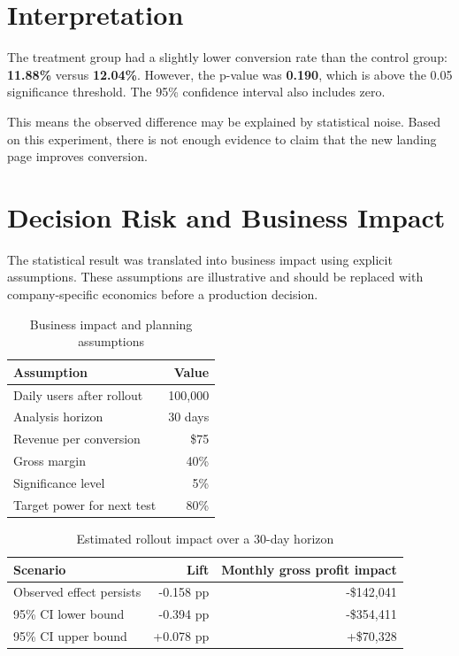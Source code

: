 \documentclass[11pt,a4paper]{article}
\begin{document}
\section{Interpretation}

The treatment group had a slightly lower conversion rate than the control group:
\textbf{11.88\%} versus \textbf{12.04\%}.
However, the p-value was \textbf{0.190}, which is above the 0.05 significance threshold.
The 95\% confidence interval also includes zero.

This means the observed difference may be explained by statistical noise.
Based on this experiment, there is not enough evidence to claim that the new landing page improves conversion.

\section{Decision Risk and Business Impact}

The statistical result was translated into business impact using explicit assumptions.
These assumptions are illustrative and should be replaced with company-specific economics before a production decision.

\begin{table}[H]
\centering
\begin{tabular}{lr}
\toprule
\textbf{Assumption} & \textbf{Value} \\
\midrule
Daily users after rollout & 100,000 \\
Analysis horizon & 30 days \\
Revenue per conversion & \$75 \\
Gross margin & 40\% \\
Significance level & 5\% \\
Target power for next test & 80\% \\
\bottomrule
\end{tabular}
\caption{Business impact and planning assumptions}
\end{table}

\begin{table}[H]
\centering
\begin{tabular}{lrr}
\toprule
\textbf{Scenario} & \textbf{Lift} & \textbf{Monthly gross profit impact} \\
\midrule
Observed effect persists & -0.158 pp & -\$142,041 \\
95\% CI lower bound & -0.394 pp & -\$354,411 \\
95\% CI upper bound & +0.078 pp & +\$70,328 \\
\bottomrule
\end{tabular}
\caption{Estimated rollout impact over a 30-day horizon}
\end{table}
\end{document}
